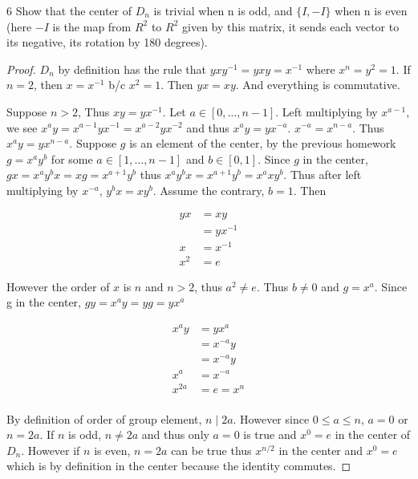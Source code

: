 \documentclass{article}
\begin{document}
\begin{claim}{6}
    Show that the center of $D_n$ is trivial when n is odd, and $\{I,-I\}$ when n is even (here $-I$ is the map from $R^2$ to $R^2$ given by this matrix, it sends each vector to its negative, its rotation by 180 degrees).
\end{claim}
\begin{proof}
    $D_n$ by definition has the rule that $yxy^{-1} = yxy = x^{-1}$ where $x^n = y^2 = 1$. 
    If $n = 2$, then $x = x^{-1}$ b/c $x^2 = 1$. Then $yx = xy$. And everything is commutative.

    Suppose $n > 2$, 
    Thus $xy = yx^{-1}$. Let $a \in [0, \ldots, n-1]$. Left multiplying by $x^{a - 1}$, we see $x^ay = x^{a-1}yx^{-1} = x^{a - 2}yx^{-2}$ and thus $x^{a}y = yx^{-a}$. $x^{-a} = x^{n - a}$. Thus $x^{a}y = yx^{n - a}$. Suppose $g$ is an element of the center, by the previous homework $g = x^ay^b$ for some $a \in [1, \ldots, n - 1]$ and $b \in [0, 1]$. Since $g$ in the center, $gx = x^{a}y^bx = xg = x^{a + 1}y^b$ thus $x^{a}y^bx = x^{a + 1}y^b = x^{a}xy^b$. Thus after left multiplying by $x^{-a}$, $y^bx = xy^b$. Assume the contrary, $b = 1$. Then 

    \begin{align*}{}
        yx &= xy \\
        &= yx^{-1} \\
        x &= x^{-1} \\
        x^2 &= e
    \end{align*}

    However the order of $x$ is $n$ and $n > 2$, thus $a^2 \neq e$. Thus $b \neq 0$ and $g = x^a$. Since g in the center, $gy = x^ay = yg = yx^a$

    \begin{align*}{}
        x^ay &= yx^a \\
        &= x^{-a}y \\
        &= x^{-a}y \\
        x^a &= x^{-a} \\
        x^{2a} &= e = x^{n} \\
    \end{align*}

    By definition of order of group element, $n \mid 2a$. However since $0 \leq a \leq n$, $a = 0$ or $n = 2a$. If $n$ is odd, $n \neq 2a$ and thus only $a = 0$ is true and $x^0 = e$ in the center of $D_n$. However if $n$ is even, $n = 2a$ can be true thus $x^{n/2}$ in the center and $x^0 = e$ which is by definition in the center because the identity commutes.
\end{proof}
\end{document}

